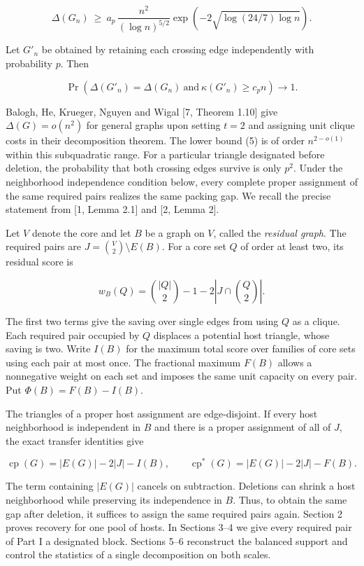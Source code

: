 \documentclass[english,11pt,a4paper]{article}
\begin{document}
\[\Delta(G_n)\ \ge\ a_p\,\frac{n^2}{(\log n)^{5/2}}
  \exp\!\left(-2\sqrt{\log(24/7)\log n}\right).
\tag{5}\]

Let \(G'_n\) be obtained by retaining each crossing edge independently with probability \(p\). Then

\[\Pr\!\left(\Delta(G'_n)=\Delta(G_n)
             \ \text{and}\ \kappa(G'_n)\ge c_p n\right)\longrightarrow 1.
\tag{6}\]

Balogh, He, Krueger, Nguyen and Wigal {[}7, Theorem 1.10{]} give \(\Delta(G)=o(n^2)\) for general graphs upon setting \(t=2\) and assigning unit clique costs in their decomposition theorem. The lower bound (5) is of order \(n^{2-o(1)}\) within this subquadratic range. For a particular triangle designated before deletion, the probability that both crossing edges survive is only \(p^2\). Under the neighborhood independence condition below, every complete proper assignment of the same required pairs realizes the same packing gap. We recall the precise statement from {[}1, Lemma 2.1{]} and {[}2, Lemma 2{]}.

Let \(V\) denote the core and let \(B\) be a graph on \(V\), called the \emph{residual graph}. The required pairs are \(J=\binom V2\setminus E(B)\). For a core set \(Q\) of order at least two, its residual score is

\[w_B(Q)=\binom{|Q|}{2}-1-2\left|J\cap\binom Q2\right|.\]

The first two terms give the saving over single edges from using \(Q\) as a clique. Each required pair occupied by \(Q\) displaces a potential host triangle, whose saving is two. Write \(I(B)\) for the maximum total score over families of core sets using each pair at most once. The fractional maximum \(F(B)\) allows a nonnegative weight on each set and imposes the same unit capacity on every pair. Put \(\Phi(B)=F(B)-I(B)\).

The triangles of a proper host assignment are edge-disjoint. If every host neighborhood is independent in \(B\) and there is a proper assignment of all of \(J\), the exact transfer identities give

\[\operatorname{cp}(G)=|E(G)|-2|J|-I(B),\qquad
\operatorname{cp}^{\ast}(G)=|E(G)|-2|J|-F(B).
\tag{7}\]

The term containing \(|E(G)|\) cancels on subtraction. Deletions can shrink a host neighborhood while preserving its independence in \(B\). Thus, to obtain the same gap after deletion, it suffices to assign the same required pairs again. Section 2 proves recovery for one pool of hosts. In Sections 3--4 we give every required pair of Part I a designated block. Sections 5--6 reconstruct the balanced support and control the statistics of a single decomposition on both scales.
\end{document}
